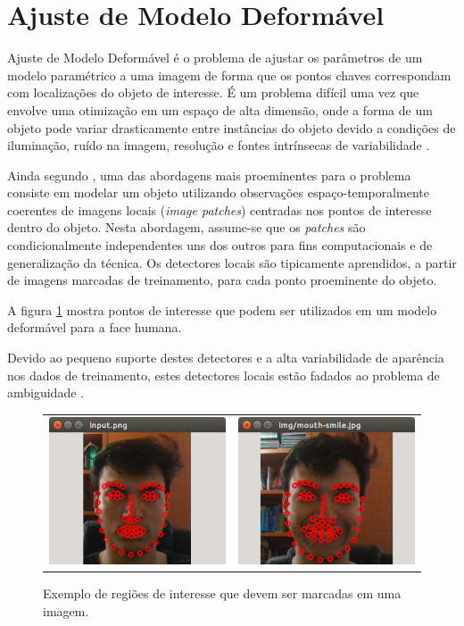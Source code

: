 \section{Ajuste de Modelo Deformável}

Ajuste de Modelo Deformável é o problema de ajustar os parâmetros de um modelo paramétrico a uma imagem de forma que os pontos chaves correspondam com localizações do objeto de interesse. É um problema difícil uma vez que envolve uma otimização em um espaço de alta dimensão, onde a forma de um objeto pode variar drasticamente entre instâncias do objeto devido a condições de iluminação, ruído na imagem, resolução e fontes intrínsecas de variabilidade \cite{saragih2011deformable}.

Ainda segundo \cite{saragih2011deformable}, uma das abordagens mais proeminentes para o problema consiste em modelar um objeto utilizando observações espaço-temporalmente coerentes de imagens locais (\textit{image patches}) centradas nos pontos de interesse dentro do objeto. Nesta abordagem, assume-se que os \textit{patches} são condicionalmente independentes uns dos outros para fins computacionais e de generalização da técnica. Os detectores locais são tipicamente aprendidos, a partir de imagens marcadas de treinamento, para cada ponto proeminente do objeto.

A figura \ref{fig:pontos-de-interesse} mostra pontos de interesse que podem ser utilizados em um modelo deformável para a face humana.

Devido ao pequeno suporte destes detectores e a alta variabilidade de aparência nos dados de treinamento, estes detectores locais estão fadados ao problema de ambiguidade \cite{saragih2011deformable}. 

\begin{figure}[!htb]
   \centering
\begin{tabular}{cc}
\includegraphics[width=0.4\linewidth]{./figs/sample-detection.png}&
\includegraphics[width=0.4\linewidth]{./figs/sample-detection-2.png}
\end{tabular}
    \caption{Exemplo de regiões de interesse que devem ser marcadas em uma imagem.}
    \label{fig:pontos-de-interesse}
\end{figure}

